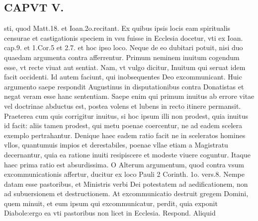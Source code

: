 \documentclass{article}
\begin{document}
\begin{pages}
\section*{CAPVT  V. }
\marginpar{[ p.389 ]}\pstart sti, quod Matt.18. et Ioan.2o.recitant. Ex quibus ipsis locis eam spiritualis censurae et castigationis speciem in vsu fuisse in Ecclesia docetur, vti ex Ioan. cap.9. et 1.Cor.5 et 2.7. et hoc ipso loco. Neque de eo dubitari potuit, nisi duo quaedam argumenta contra afferrentur. Primum neminem inuitum cogendum esse, vt recte viuat aut sentiat. Nam, vt vulgo dicitur, Inuitum qui seruat idem facit occidenti. Id autem faciunt, qui inobsequentes Deo excommunicant. Huic argumento saepe respondit Augustinus in disputationibus contra Donatistas et negat veram esse hanc sententiam. Saepe enim qui primum inuitus ab errore vitae vel doctrinae abductus est, postea volens et lubens in recto itinere permansit. Praeterea cum quis corrigitur inuitus, si hoc ipsum illi non prodest, quia inuitus id facit: aliis tamen prodest, qui metu poenae coercentur, ne ad eadem scelera exemplo pertrahantur. Denique haec eadem ratio facit ne in sceleratos homines vllos, quantumuis impios et derestabiles, poenae vllae etiam a Magistratu decernantur, quia ea ratione inuiti resipiscere et modeste viuere coguntur. Itaque haec prima ratio est absurdissima. O Alterum argumentum, quod contra vsum excommunicationis affertur, ducitur ex loco Pauli 2 Corinth. 1o. vers.8. Nempe datam esse pastoribus, et Ministris verbi Dei potestatem ad aedificationem, non ad subuersionem et destructionem. At excommunicatio destruit gregem Domini, quem minuit, et eum ipsum qui excommunicatur, perdit, quia exponit Diabole:ergo ea vti pastoribus non licet in Ecclesia. Respond. Aliquid  \pend

\end{pages}
\end{document}

